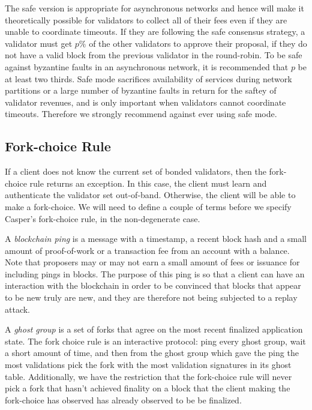 \documentclass[11pt,a4paper]{article}
\begin{document}
The safe version is appropriate for asynchronous networks and hence will make it theoretically possible for validators to collect all of their fees even if they are unable to coordinate timeouts. If they are following the safe consensus strategy, a validator must get $p\%$ of the other validators to approve their proposal, if they do not have a valid block from the previous validator in the round-robin. To be safe against byzantine faults in an asynchronous network, it is recommended that $p$ be at least two thirds. Safe mode sacrifices availability of services during network partitions or a large number of byzantine faults in return for the saftey of validator revenues, and is only important when validators cannot coordinate timeouts. Therefore we strongly recommend against ever using safe mode.


\subsection{Fork-choice Rule}

If a client does not know the current set of bonded validators, then the fork-choice rule returns an exception. In this case, the client must learn and authenticate the validator set out-of-band. Otherwise, the client will be able to make a fork-choice. We will need to define a couple of terms before we specify Casper's fork-choice rule, in the non-degenerate case.

A \emph{blockchain ping} is a message with a timestamp, a recent block hash and a small amount of proof-of-work or a transaction fee from an account with a balance. Note that proposers may or may not earn a small amount of fees or issuance for including pings in blocks. The purpose of this ping is so that a client can have an interaction with the blockchain in order to be convinced that blocks that appear to be new truly are new, and they are therefore not being subjected to a replay attack.

A \emph{ghost group} is a set of forks that agree on the most recent finalized application state. The fork choice rule is an interactive protocol: ping every ghost group, wait a short amount of time, and then from the ghost group which gave the ping the most validations pick the fork with the most validation signatures in its ghost table. Additionally, we have the restriction that the fork-choice rule will never pick a fork that hasn't achieved finality on a block that the client making the fork-choice has observed has already observed to be be finalized. 
\end{document}
